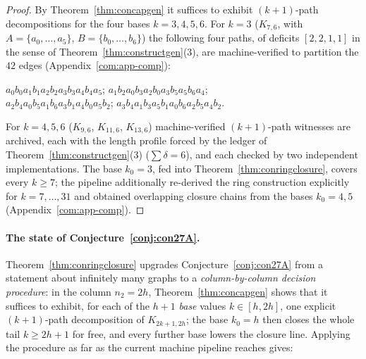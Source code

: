 \begin{proof}
By Theorem~\ref{thm:concapgen} it suffices to exhibit $(k+1)$-path
decompositions for the four bases $k=3,4,5,6$. For $k=3$ ($K_{7,6}$, with
$A=\{a_0,\dots,a_5\}$, $B=\{b_0,\dots,b_6\}$) the following four paths, of
deficits $[2,2,1,1]$ in the sense of Theorem~\ref{thm:constructgen}(3),
are machine-verified to partition the $42$ edges (Appendix~\ref{com:app-comp}):
\begin{center}\small
$a_0b_0a_1b_1a_2b_2a_3b_3a_4b_4a_5$;\quad
$a_1b_2a_0b_3a_2b_0a_3b_5a_5b_6a_4$;\\
$a_2b_4a_0b_5a_1b_6a_3b_1a_4b_0a_5b_2$;\quad
$a_3b_4a_1b_3a_5b_1a_0b_6a_2b_5a_4b_2$.
\end{center}
For $k=4,5,6$ ($K_{9,6}$, $K_{11,6}$, $K_{13,6}$) machine-verified
$(k+1)$-path witnesses are archived, each with the length profile forced
by the ledger of Theorem~\ref{thm:constructgen}(3) ($\sum\delta=6$), and
each checked by two independent implementations. The base $k_0=3$, fed
into Theorem~\ref{thm:conringclosure}, covers every $k\ge7$; the pipeline
additionally re-derived the ring construction explicitly for $k=7,\dots,31$
and obtained overlapping closure chains from the bases $k_0=4,5$
(Appendix~\ref{com:app-comp}).
\end{proof}

\paragraph{The state of Conjecture~\ref{conj:con27A}.}
Theorem~\ref{thm:conringclosure} upgrades Conjecture~\ref{conj:con27A}
from a statement about infinitely many graphs to a
\emph{column-by-column decision procedure}: in the column $n_2=2h$,
Theorem~\ref{thm:concapgen} shows that it suffices to exhibit, for each of
the $h+1$ \emph{base} values $k\in[h,2h]$, one explicit $(k+1)$-path
decomposition of $K_{2k+1,2h}$; the base $k_0=h$ then closes the whole
tail $k\ge2h+1$ for free, and every further base lowers the closure line.
Applying the procedure as far as the current machine pipeline reaches
gives:

